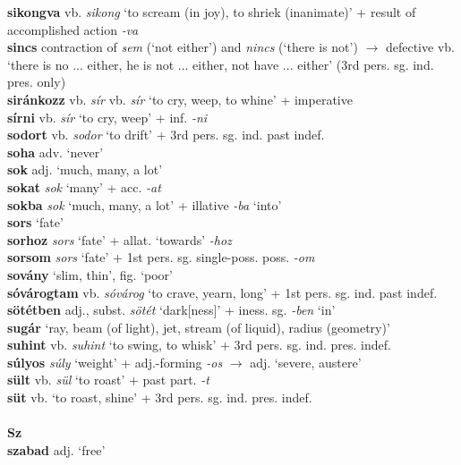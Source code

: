 \documentclass[11pt]{article}
\begin{document}
\textbf{sikongva} vb. \emph{sikong} `to scream (in joy), to shriek
(inanimate)' + result of accomplished action \emph{-va} \\
\textbf{sincs} contraction of \emph{sem} (`not either')
and \emph{nincs} (`there is not') $\rightarrow$ defective vb. `there
is no ... either, he is not ... either, not have ... either' (3rd
pers. sg. ind. pres. only) \\
\textbf{siránkozz} vb. \emph{sír} vb. \emph{sír} `to cry, weep, to whine' + imperative \\
\textbf{sírni} vb. \emph{sír} `to cry, weep' + inf. \emph{-ni} \\
\textbf{sodort} vb. \emph{sodor} `to drift' + 3rd pers. sg. ind. past
indef. \\
\textbf{soha} adv. `never' \\
\textbf{sok} adj. `much, many, a lot' \\
\textbf{sokat} \emph{sok} `many' + acc. \emph{-at} \\
\textbf{sokba} \emph{sok} `much, many, a lot' + illative \emph{-ba}
`into' \\
\textbf{sors} `fate' \\
\textbf{sorhoz} \emph{sors} `fate' + allat. `towards' \emph{-hoz} \\
\textbf{sorsom} \emph{sors} `fate' + 1st
pers. sg. single\hyp{}poss. poss. \emph{-om} \\
\textbf{sovány} `slim, thin', fig. `poor' \\
\textbf{sóvárogtam} vb. \emph{sóvárog} `to crave, yearn, long' + 1st
pers. sg. ind. past indef. \\
\textbf{sötétben} adj., subst. \emph{sötét} `dark[ness]' +
iness. sg. \emph{-ben} `in' \\
\textbf{sugár} `ray, beam (of light), jet, stream (of liquid), radius
(geometry)' \\
\textbf{suhint} vb. \emph{suhint} `to swing, to whisk' + 3rd
pers. sg. ind. pres. indef. \\
\textbf{súlyos} \emph{súly} `weight' + adj.\hyp{}forming \emph{-os}
$\rightarrow$ adj. `severe, austere' \\
\textbf{sült} vb. \emph{sül} `to roast' + past part. \emph{-t} \\
\textbf{süt} vb. `to roast, shine' + 3rd pers. sg. ind. pres. indef. \\
\ \\
\noindent \textbf{\large Sz} \\
\textbf{szabad} adj. `free' \\
\end{document}
